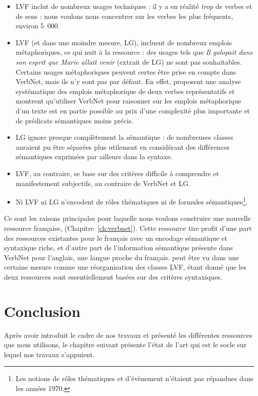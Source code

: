 \begin{itemize}
    \item LVF inclut de nombreux usages techniques : il y a en réalité
        \emph{trop} de verbes et de sens : nous voulons nous concentrer sur les
        verbes les plus fréquents, environ 5~000.
    \item LVF (et dans une moindre mesure, LG), incluent de nombreux emplois
        métaphoriques, ce qui nuit à la ressource : des usages tels que
        \textit{Il galopait dans son esprit que Marie allait venir} (extrait de
        LG) ne sont pas souhaitables. Certains usages métaphoriques peuvent
        certes être prise en compte dans VerbNet, mais ils n'y sont pas par
        défaut. En effet, \cite{brown2012semantic} proposent une analyse
        systématique des emplois métaphorique de deux verbes représentatifs et
        montrent qu'utiliser VerbNet pour raisonner sur les emplois
        métaphorique d'un texte est en partie possible au prix d'une complexité
        plus importante et de prédicats sémantiques moins précis.
    \item LG ignore presque complètement la sémantique : de nombreuses classes
        auraient pu être séparées plus utilement en considérant des différences
        sémantiques exprimées par ailleurs dans la syntaxe.
    \item LVF, au contraire, se base sur des critères difficile à comprendre et
        manifestement subjectifs, au contraire de VerbNet et LG.
    \item Ni LVF ni LG n'encodent de rôles thématiques ni de formules
        sémantiques\footnote{Les notions de rôles thématiques et d'évènement
        n'étaient pas répandues dans les années 1970.}.
\end{itemize}

Ce sont les raisons principales pour laquelle nous voulons construire une
nouvelle ressource française, \verbenet{} (Chapitre~\ref{ch:verbnet}). Cette
ressource tire profit d'une part des ressources existantes pour le français
avec un encodage sémantique et syntaxique riche, et d'autre part de
l'information sémantique présente dans VerbNet pour l'anglais, une langue
proche du français. \verbenet{} peut être vu dans une certaine mesure comme une
réorganisation des classes LVF, étant donné que les deux ressources sont
essentiellement basées sur des critères syntaxiques.

\section*{Conclusion}

Après avoir introduit le cadre de nos travaux et présenté les différentes
ressources que nous utilisons, le chapitre suivant présente l'état de l'art qui
est le socle sur lequel nos travaux s'appuient.

